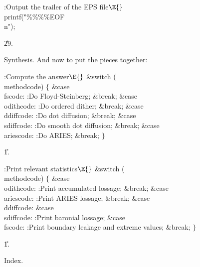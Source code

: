 \B{}:Output the trailer of the EPS file\X${}\E{}$\6
\\{printf}(\.{"\%\%\%\%EOF\\n"});\par
\U29.\fi

Synthesis. And now to put the pieces together:

\Y\B\4:Compute the answer\X${}\E{}$\6
\&{switch} (\\{methodcode})\5
${}\{{}$\1\6
\4\&{case} \\{fscode}:\5
:Do Floyd-Steinberg\X;\5
\&{break};\6
\4\&{case} \\{odithcode}:\5
:Do ordered dither\X;\5
\&{break};\6
\4\&{case} \\{ddiffcode}:\5
:Do dot diffusion\X;\5
\&{break};\6
\4\&{case} \\{sdiffcode}:\5
:Do smooth dot diffusion\X;\5
\&{break};\6
\4\&{case} \\{ariescode}:\5
:Do ARIES\X;\5
\&{break};\6
\4${}\}{}$\2\par
\U1.\fi

\B{}:Print relevant statistics\X${}\E{}$\6
\&{switch} (\\{methodcode})\5
${}\{{}$\1\6
\4\&{case} \\{odithcode}:\5
:Print accumulated lossage\X;\5
\&{break};\6
\4\&{case} \\{ariescode}:\5
:Print ARIES lossage\X;\5
\&{break};\6
\4\&{case} \\{ddiffcode}:\5
\&{case} \\{sdiffcode}:\5
:Print baronial lossage\X;\6
\4\&{case} \\{fscode}:\5
:Print boundary leakage and extreme values\X;\5
\&{break};\6
\4${}\}{}$\2\par
\U1.\fi

Index.
\fi

\inx
\fin
\con

